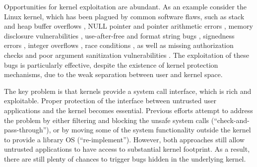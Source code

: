 \par
Opportunities for kernel exploitation are abundant. As an example consider
the Linux kernel, which has been plagued by common software flaws, such as
stack and heap buffer overflows \cite{CVE:20093234, CVE:20131828,
CVE:20132892}, NULL pointer and pointer arithmetic errors
\cite{CVE:20050736, CVE:20092698}, memory disclosure vulnerabilities
\cite{CVE:20093002, CVE:20104073}, use-after-free and format string bugs
\cite{CVE:20132852, CVE:20134343}, signedness errors \cite{CVE:20103437,
CVE:20132094}, integer overflows \cite{CVE:20050736, CVE:20102959}, race
conditions \cite{CVE:20091527, CVE:20093547}, as well as missing
authorization checks and poor argument sanitization vulnerabilities
\cite{CVE:20103904, CVE:20104347, CVE:20120946, CVE:20130268}. The
exploitation of these bugs is particularly effective, despite the existence
of kernel protection mechanisms, due to the weak separation between user
and kernel space.


\par
The key problem is that kernels provide a system call interface, which is
rich and exploitable. Proper protection of the interface between untrusted
user applications and the kernel becomes essential. Previous efforts
attempt to address the problem by either filtering and blocking the unsafe
system calls (``check-and-pass-through''), or by moving some of the system
functionality outside the kernel to provide a library OS
\cite{Drawbridge:11} (``re-implement''). However, both approaches still
allow untrusted applications to have access to substantial kernel
footprint. As a result, there are still plenty of chances to trigger bugs
hidden in the underlying kernel.




